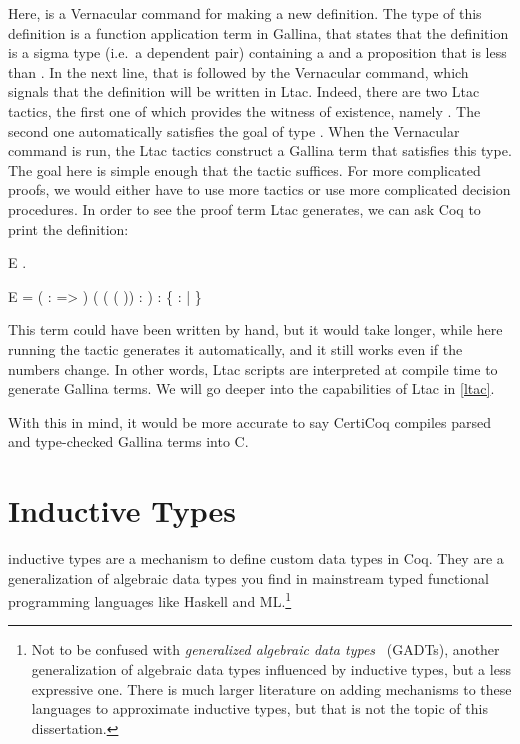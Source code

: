Here,  is a \gls{Vernacular} command for making a new definition. The type of this definition is a function application term in \gls{Gallina}, that states that the definition is a sigma type (i.e.\ a dependent pair) containing a  and a proposition that  is less than . 
In the next line, that is followed by the  \gls{Vernacular} command, which signals that the definition will be written in \gls{Ltac}. Indeed, there are two \gls{Ltac} tactics, the first one of which provides the witness of existence, namely . The second one automatically satisfies the goal of type . When the \gls{Vernacular} command  is run, the \gls{Ltac} tactics construct a \gls{Gallina} term that satisfies this type. The goal here is simple enough that the  tactic suffices. For more complicated proofs, we would either have to use more tactics or use more complicated decision procedures. In order to see the proof term \gls{Ltac} generates, we can ask Coq to print the definition:

\vspace{.2in}
\begin{SaveVerbatim}{E}
 .
\end{SaveVerbatim}

\begin{SaveVerbatim}{E}
 = 
      (  :  =>  \ty{<} )  (   (   ( )) :  \bn{<} )
     : \{  :  |  \ty{<}  \}
\end{SaveVerbatim}

This term could have been written by hand, but it would take longer, while here running the  tactic generates it automatically, and it still works even if the numbers change. In other words, \gls{Ltac} scripts are interpreted at compile time to generate \gls{Gallina} terms. We will go deeper into the capabilities of \gls{Ltac} in \autoref{ltac}.

With this in mind, it would be more accurate to say CertiCoq compiles parsed and type-checked \gls{Gallina} terms into C.

\section{Inductive Types}

\Gls{inductive type}s are a mechanism to define custom data types in Coq.
They are a generalization of algebraic data types you find in mainstream typed functional programming languages like Haskell and ML.\footnote{Not to be confused with \emph{generalized algebraic data types}~\cite{cheney2003first} (GADTs), another generalization of algebraic data types influenced by inductive types, but a less expressive one. There is much larger literature on adding mechanisms to these languages to approximate \gls{inductive type}s, but that is not the topic of this dissertation.}
\newpage


